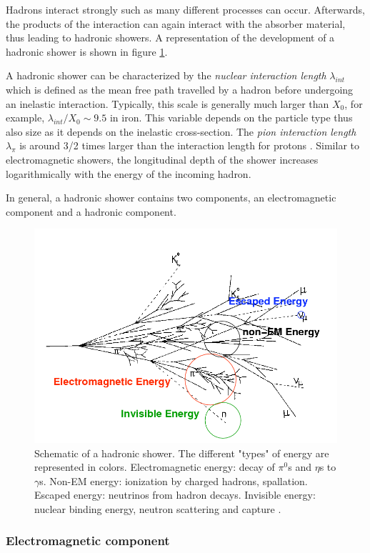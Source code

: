 Hadrons interact strongly such as many different processes can occur. Afterwards, the products of the interaction can again interact with the absorber material, thus leading to hadronic showers. A representation of the development of a hadronic shower is shown in figure \ref{fig:HadShower}.

A hadronic shower can be characterized by the \textit{nuclear interaction length} $\lambda_{int}$ which is defined as the mean free path travelled by a hadron before undergoing an inelastic interaction. Typically, this scale is generally much larger than $X_0$, for example, $\lambda_{int}/X_0 \sim 9.5$ in iron. This variable depends on the particle type thus also size as it depends on the inelastic cross-section. The \textit{pion interaction length} $\lambda_{\pi}$ is around 3/2 times larger than the interaction length for protons \cite{Wigmans:392793}. Similar to electromagnetic showers, the longitudinal depth of the shower increases logarithmically with the energy of the incoming hadron.

In general, a hadronic shower contains two components, an electromagnetic component and a hadronic component.

\begin{figure}[htbp!]
  \centering
  \includegraphics[width=0.6\linewidth]{chap2/fig/images_had-shower.png}
  \caption{Schematic of a hadronic shower. The different "types" of energy are represented in colors. Electromagnetic energy: decay of $\pi^0$s and $\eta$s to $\gamma$s. Non-EM energy: ionization by charged hadrons, spallation. Escaped energy: neutrinos from hadron decays. Invisible energy: nuclear binding energy, neutron scattering and capture \cite{Grahn:2009ki}.} \label{fig:HadShower}
\end{figure}

\subsubsection{Electromagnetic component}

